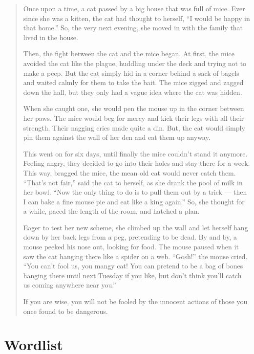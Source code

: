 \begin{quotation}
    Once upon a time, a cat passed by a big house that was full of mice. Ever since she was a kitten, the cat had thought to herself, “I would be happy in that home.” So, the very next evening, she moved in with the family that lived in the house. 
    
    Then, the fight between the cat and the mice began. At first, the mice avoided the cat like the plague, huddling under the deck and trying not to make a peep. But the cat simply hid in a corner behind a sack of bagels and waited calmly for them to take the bait. The mice zigged and zagged down the hall, but they only had a vague idea where the cat was hidden. 
    
    When she caught one, she would pen the mouse up in the corner between her paws. The mice would beg for mercy and kick their legs with all their strength. Their nagging cries made quite a din. But, the cat would simply pin them against the wall of her den and eat them up anyway. 
    
    This went on for six days, until finally the mice couldn’t stand it anymore. Feeling angry, they decided to go into their holes and stay there for a week. This way, bragged the mice, the mean old cat would never catch them. “That’s not fair,” said the cat to herself, as she drank the pool of milk in her bowl. “Now the only thing to do is to pull them out by a trick — then I can bake a fine mouse pie and eat like a king again.” So, she thought for a while, paced the length of the room, and hatched a plan. 
    
    Eager to test her new scheme, she climbed up the wall and let herself hang down by her back legs from a peg, pretending to be dead. By and by, a mouse peeked his nose out, looking for food. The mouse paused when it saw the cat hanging there like a spider on a web. “Gosh!” the mouse cried. “You can’t fool us, you mangy cat! You can pretend to be a bag of bones hanging there until next Tuesday if you like, but don’t think you’ll catch us coming anywhere near you.” 
    
    If you are wise, you will not be fooled by the innocent actions of those you once found to be dangerous.
\end{quotation}

\newpage
\section{Wordlist}
\label{appendix:wordlist}


